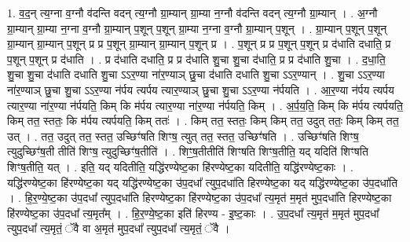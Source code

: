 \documentclass[17pt]{extarticle}
\begin{document}
1. व॒द॒न् त्य॒ग्ना व॒ग्नौ व॑दन्ति वदन् त्य॒ग्नौ ग्रा॒म्यान् ग्रा॒म्या न॒ग्नौ व॑दन्ति वदन् त्य॒ग्नौ ग्रा॒म्यान् । . अ॒ग्नौ ग्रा॒म्यान् ग्रा॒म्या न॒ग्ना व॒ग्नौ ग्रा॒म्यान् प॒शून् प॒शून् ग्रा॒म्या न॒ग्ना व॒ग्नौ ग्रा॒म्यान् प॒शून् । . ग्रा॒म्यान् प॒शून् प॒शून् ग्रा॒म्यान् ग्रा॒म्यान् प॒शून् प्र प्र प॒शून् ग्रा॒म्यान् ग्रा॒म्यान् प॒शून् प्र । . प॒शून् प्र प्र प॒शून् प॒शून् प्र द॑धाति दधाति॒ प्र प॒शून् प॒शून् प्र द॑धाति । . प्र द॑धाति दधाति॒ प्र प्र द॑धाति शु॒चा शु॒चा द॑धाति॒ प्र प्र द॑धाति शु॒चा । . द॒धा॒ति॒ शु॒चा शु॒चा द॑धाति दधाति शु॒चा ऽऽर॒ण्या ना॑र॒ण्याञ् छु॒चा द॑धाति दधाति शु॒चा ऽऽर॒ण्यान् । . शु॒चा ऽऽर॒ण्या ना॑र॒ण्याञ् छु॒चा शु॒चा ऽऽर॒ण्या न॑र्पय त्यर्पय त्यार॒ण्याञ् छु॒चा शु॒चा ऽऽर॒ण्या न॑र्पयति । . आ॒र॒ण्या न॑र्पय त्यर्पय त्यार॒ण्या ना॑र॒ण्या न॑र्पयति॒ किम् कि म॑र्पय त्यार॒ण्या ना॑र॒ण्या न॑र्पयति॒ किम् । . अ॒र्प॒य॒ति॒ किम् कि म॑र्पय त्यर्पयति॒ किम् तत॒ स्ततः॒ कि म॑र्पय त्यर्पयति॒ किम् ततः॑ । . किम् तत॒ स्ततः॒ किम् किम् तत॒ उदुत् ततः॒ किम् किम् तत॒ उत् । . तत॒ उदुत् तत॒ स्तत॒ उच्छिꣳ॑षति शिꣳष॒ त्युत् तत॒ स्तत॒ उच्छिꣳ॑षति । . उच्छिꣳ॑षति शिꣳष॒ त्युदुच्छिꣳ॑ष॒ती तीति॑ शिꣳष॒ त्युदुच्छिꣳ॑ष॒तीति॑ । . शिꣳ॒॒ष॒तीतीति॑ शिꣳषति शिꣳष॒तीति॒ यद् यदिति॑ शिꣳषति शिꣳष॒तीति॒ यत् । . इति॒ यद् यदितीति॒ यद्धि॑रण्येष्ट॒का हि॑रण्येष्ट॒का यदितीति॒ यद्धि॑रण्येष्ट॒काः । . यद्धि॑रण्येष्ट॒का हि॑रण्येष्ट॒का यद् यद्धि॑रण्येष्ट॒का उ॑प॒दधा᳚ त्युप॒दधा॑ति हिरण्येष्ट॒का यद् 
यद्धि॑रण्येष्ट॒का उ॑प॒दधा॑ति । . हि॒र॒ण्ये॒ष्ट॒का उ॑प॒दधा᳚ त्युप॒दधा॑ति हिरण्येष्ट॒का हि॑रण्येष्ट॒का उ॑प॒दधा᳚ त्य॒मृत॑ म॒मृत॑ मुप॒दधा॑ति हिरण्येष्ट॒का हि॑रण्येष्ट॒का उ॑प॒दधा᳚ त्य॒मृत᳚म् । . हि॒र॒ण्ये॒ष्ट॒का इति॑ हिरण्य - इ॒ष्ट॒काः । . उ॒प॒दधा᳚ त्य॒मृत॑ म॒मृत॑ मुप॒दधा᳚ त्युप॒दधा᳚ त्य॒मृतं॒ ॅवै वा अ॒मृत॑ मुप॒दधा᳚ त्युप॒दधा᳚ त्य॒मृतं॒ ॅवै । \newline
\end{document}
